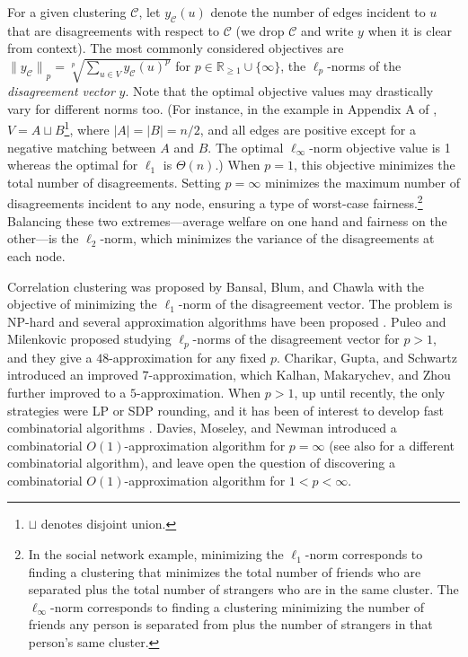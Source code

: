 For a given clustering $\mathcal{C}$, let $y_{\mathcal{C}}(u)$ denote the number of edges incident to $u$ that are disagreements with respect to $\mathcal{C}$ (we drop $\mathcal{C}$ and write $y$ when it is clear from context).  
The most commonly considered objectives are ${\lVert y_{\mathcal{C}} \rVert}_p = \sqrt[p]{\sum_{u \in V} y_{\mathcal{C}}(u)^p}$ for $p \in \mathbb{R}_{\geq 1} \cup \{\infty\}$,
the $\ell_p$-norms of the \emph{disagreement vector} $y$.   
Note that the optimal objective values may drastically vary for different norms too.  (For instance, in the example in Appendix A of \cite{PM16}, $V=A \sqcup B$\footnote{$\sqcup$ denotes disjoint union.}, where $|A| = |B| = n/2$, and all edges are positive except for a negative matching between $A$ and $B$. The optimal $\ell_\infty$-norm objective value is 1 whereas the optimal for $\ell_1$ is $\Theta(n)$.)
When $p=1$, this objective minimizes the total number of disagreements.  Setting $p = \infty$ minimizes the maximum number of disagreements incident to any node, ensuring a type of worst-case fairness.\footnote{In the social network example, minimizing the $\ell_1$-norm corresponds to finding a clustering that minimizes the total number of friends who are separated plus the total number of strangers who are in the same cluster. The $\ell_\infty$-norm corresponds to finding a clustering minimizing the number of friends any person is separated from plus the number of strangers in that person's same cluster.}  
Balancing these two extremes---average welfare on one hand and fairness on the other---is the $\ell_2$-norm, which minimizes the variance of the disagreements at each node.


Correlation clustering was proposed by Bansal, Blum, and Chawla \citeyearpar{BBC04} with the objective of minimizing the $\ell_1$-norm of the disagreement vector.
The problem is \textsf{NP}-hard and several approximation algorithms have been proposed \cite{BBC04, ACN-pivot, chawla2015near, cohen2022correlation}.  
Puleo and Milenkovic \citeyearpar{PM16} proposed studying $\ell_p$-norms of the disagreement vector for $p >1$, and they give a $48$-approximation for any fixed $p$. 
Charikar, Gupta, and Schwartz \citeyearpar{CGS17} introduced an improved $7$-approximation, which  Kalhan,  Makarychev, and  Zhou \citeyearpar{KMZ19} further improved to a $5$-approximation. When $p >1$, up until recently, the only strategies were LP or SDP rounding, and it has been of interest to develop fast combinatorial algorithms \cite{veldt2022correlation}.   
Davies, Moseley, and Newman \citeyearpar{DMN23} introduced a combinatorial $O(1)$-approximation algorithm for $p= \infty$ (see also \cite{minmax4approx} for a different combinatorial algorithm),
and leave open the question of discovering a combinatorial $O(1)$-approximation algorithm for $1 < p < \infty$.

